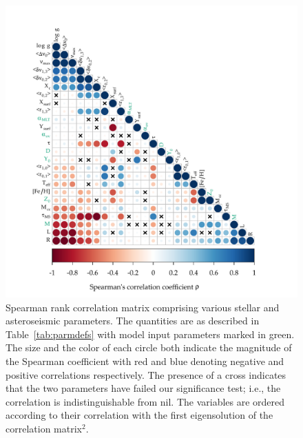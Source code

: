 \begin{figure}
    \centering
    \includegraphics[trim={1.5cm 0 2cm 1cm},clip, width=\textwidth]{filter-corr-spearman2.pdf}
    \caption[Rank correlation diagram]{Spearman rank correlation matrix comprising various stellar and asteroseismic parameters. The quantities are as described in Table~\ref{tab:parmdefs}
    with model input parameters marked in green.
    The size and the color of each circle both indicate the magnitude of the Spearman coefficient with red and blue denoting negative and positive correlations respectively.  The presence of a cross indicates that 
the two parameters have failed our significance test; i.e., the correlation is indistinguishable from nil. 
The variables are ordered according to their correlation with the first eigensolution of the correlation matrix$^2$.}
    \label{fig:filt_corr}
\end{figure}


